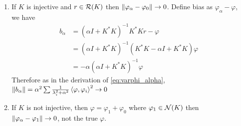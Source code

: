 \begin{enumerate}
    \item  If $K$ is injective and $r\in \mathcal{R}(K)$ then
          $\left\| \varphi_\alpha-\varphi_0 \right\|\to 0$. Define bias as
          $\varphi_\alpha-\varphi$, we have \begin{equation*}
              \begin{split}
                  b_\alpha&=(\alpha I+K^*K)^{-1}K^*Kr-\varphi\\
                  &=(\alpha I+K^*K)^{-1}(K^*K-\alpha I+K^*K)\varphi\\
                  &=-\alpha(\alpha I+K^*K)^{-1}\varphi
              \end{split}
          \end{equation*}
          Therefore as in the derivation of \eqref{eq:varphi_alpha}, $\left\| b_\alpha \right\| = \alpha^2\sum \frac{1}{\lambda_i^2+\alpha^2}\left\langle \varphi,\varphi_i\right\rangle^2\to 0$
    \item If $K$ is not injective, then $\varphi=\varphi_1+\varphi_0$ where $\varphi_1\in
              \mathcal{N}(K)$ then $\left\| \varphi_\alpha-\varphi_1 \right\|\to 0$, not the true $\varphi$.
\end{enumerate}

